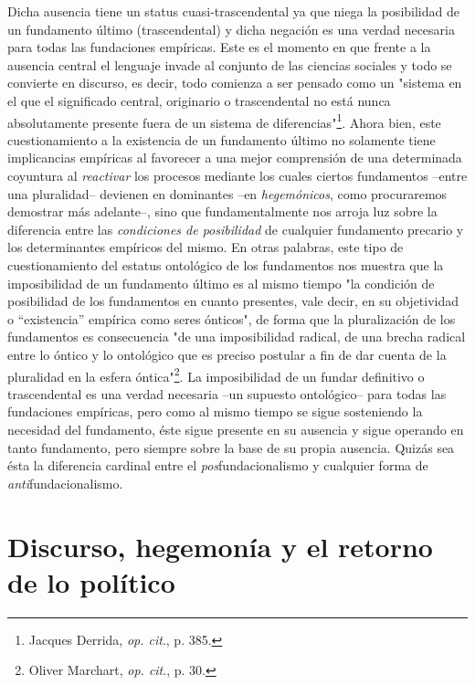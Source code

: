 \documentclass{book}
\begin{document}
Dicha ausencia tiene un status cuasi-trascendental ya que niega la
posibilidad de un fundamento último (trascendental) y dicha negación es
una verdad necesaria para todas las fundaciones empíricas. Este es el
momento en que frente a la ausencia central el lenguaje invade al
conjunto de las ciencias sociales y todo se convierte en discurso, es
decir, todo comienza a ser pensado como un "sistema en el que el
significado central, originario o trascendental no está nunca
absolutamente presente fuera de un sistema de diferencias"\footnote{Jacques
  Derrida, \emph{op. cit}., p. 385.}. Ahora bien, este cuestionamiento a
la existencia de un fundamento último no solamente tiene implicancias
empíricas al favorecer a una mejor comprensión de una determinada
coyuntura al \emph{reactivar} los procesos mediante los cuales ciertos
fundamentos --entre una pluralidad-- devienen en dominantes --en
\emph{hegemónicos}, como procuraremos demostrar más adelante--, sino que
fundamentalmente nos arroja luz sobre la diferencia entre las
\emph{condiciones de posibilidad} de cualquier fundamento precario y los
determinantes empíricos del mismo. En otras palabras, este tipo de
cuestionamiento del estatus ontológico de los fundamentos nos muestra
que la imposibilidad de un fundamento último es al mismo tiempo "la
condición de posibilidad de los fundamentos en cuanto presentes, vale
decir, en su objetividad o ``existencia'' empírica como seres ónticos",
de forma que la pluralización de los fundamentos es consecuencia "de una
imposibilidad radical, de una brecha radical entre lo óntico y lo
ontológico que es preciso postular a fin de dar cuenta de la pluralidad
en la esfera óntica"\footnote{Oliver Marchart, \emph{op. cit}., p. 30.}.
La imposibilidad de un fundar definitivo o trascendental es una verdad
necesaria --un supuesto ontológico-- para todas las fundaciones
empíricas, pero como al mismo tiempo se sigue sosteniendo la necesidad
del fundamento, éste sigue presente en su ausencia y sigue operando en
tanto fundamento, pero siempre sobre la base de su propia ausencia.
Quizás sea ésta la diferencia cardinal entre el
\emph{pos}fundacionalismo y cualquier forma de
\emph{anti}fundacionalismo.

\hypertarget{discurso-hegemonuxeda-y-el-retorno-de-lo-poluxedtico}{%
\section{Discurso, hegemonía y el retorno de lo
político}\label{discurso-hegemonuxeda-y-el-retorno-de-lo-poluxedtico}}
\end{document}
